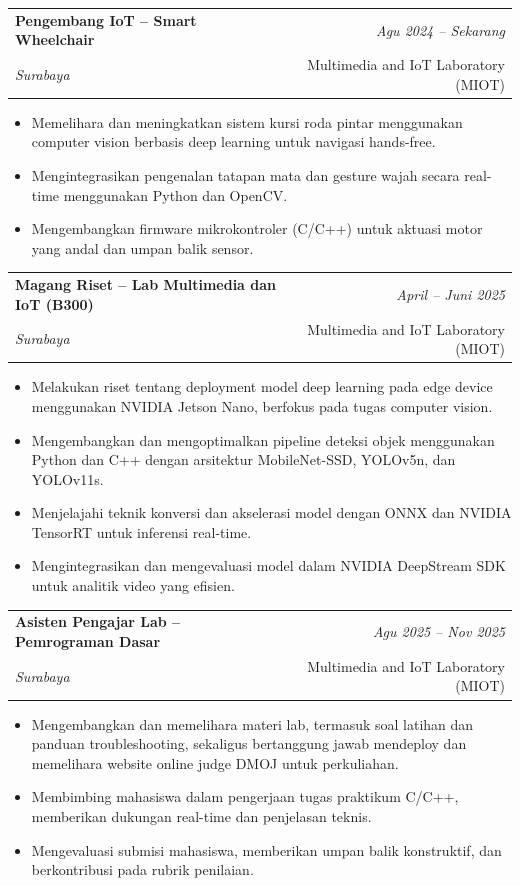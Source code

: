 \documentclass[a4paper,11pt]{article}
\makeatletter
\newcommand{\resumeSubheading}[4]{
\vspace{0.5mm}\item
    \begin{tabular*}{0.98\textwidth}[t]{l@{\extracolsep{\fill}}r}
        \textbf{#1} & \textit{\footnotesize{#4}} \\
        \textit{\footnotesize{#3}} &  \footnotesize{#2}\\
    \end{tabular*}
    \vspace{-2.4mm}
}
\newcommand{\resumeItemListStart}{\begin{justify}\begin{itemize}[leftmargin=3ex, rightmargin=2ex, noitemsep,labelsep=1.2mm,itemsep=0mm]\small}
\newcommand{\resumeItemListEnd}{\end{itemize}\end{justify}\vspace{-2mm}}
\makeatother
\begin{document}
\vspace{-2mm}
\resumeSubheading
{Pengembang IoT -- Smart Wheelchair}{Multimedia and IoT Laboratory (MIOT)}
{Surabaya}{Agu 2024 -- Sekarang}
\resumeItemListStart
\item {Memelihara dan meningkatkan sistem kursi roda pintar menggunakan computer vision berbasis deep learning untuk navigasi hands-free.}
\item {Mengintegrasikan pengenalan tatapan mata dan gesture wajah secara real-time menggunakan Python dan OpenCV.}
\item {Mengembangkan firmware mikrokontroler (C/C++) untuk aktuasi motor yang andal dan umpan balik sensor.}
\resumeItemListEnd

\resumeSubheading
{Magang Riset -- Lab Multimedia dan IoT (B300)}{Multimedia and IoT Laboratory (MIOT)}
{Surabaya}{April -- Juni 2025}
\resumeItemListStart
\item {Melakukan riset tentang deployment model deep learning pada edge device menggunakan NVIDIA Jetson Nano, berfokus pada tugas computer vision.}
\item {Mengembangkan dan mengoptimalkan pipeline deteksi objek menggunakan Python dan C++ dengan arsitektur MobileNet-SSD, YOLOv5n, dan YOLOv11s.}
\item {Menjelajahi teknik konversi dan akselerasi model dengan ONNX dan NVIDIA TensorRT untuk inferensi real-time.}
\item {Mengintegrasikan dan mengevaluasi model dalam NVIDIA DeepStream SDK untuk analitik video yang efisien.}
\resumeItemListEnd



\resumeSubheading
{Asisten Pengajar Lab -- Pemrograman Dasar}{Multimedia and IoT Laboratory (MIOT)}
{Surabaya}{Agu 2025 -- Nov 2025}
\resumeItemListStart
\item {Mengembangkan dan memelihara materi lab, termasuk soal latihan dan panduan troubleshooting, sekaligus bertanggung jawab mendeploy dan memelihara website online judge DMOJ untuk perkuliahan.}
\item {Membimbing mahasiswa dalam pengerjaan tugas praktikum C/C++, memberikan dukungan real-time dan penjelasan teknis.}
\item {Mengevaluasi submisi mahasiswa, memberikan umpan balik konstruktif, dan berkontribusi pada rubrik penilaian.}
\resumeItemListEnd
\vspace{-2mm}

\end{document}
